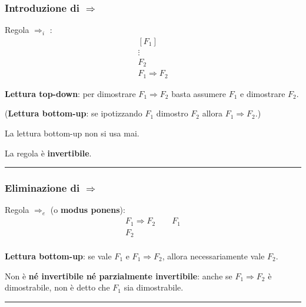 \documentclass[
  a4paper,
]{article}
\begin{document}
\hypertarget{introduzione-di-rightarrow}{%
\subsubsection{\texorpdfstring{Introduzione di
\(\Rightarrow\)}{Introduzione di \textbackslash Rightarrow}}\label{introduzione-di-rightarrow}}

Regola \(\Rightarrow_i\) : \[
\begin{matrix} 
[F_1] \\
\vdots \\
F_2 \\
\hline
F_1 \Rightarrow F_2 
\end{matrix}
\]

\textbf{Lettura top-down}: per dimostrare \(F_1 \Rightarrow F_2\) basta
assumere \(F_1\) e dimostrare \(F_2\).

(\textbf{Lettura bottom-up}: se ipotizzando \(F_1\) dimostro \(F_2\)
allora \(F_1 \Rightarrow F_2\).)

La lettura bottom-up non si usa mai.

La regola è \textbf{invertibile}.

\par\noindent\rule{\linewidth}{0.4pt}\par\vspace{6pt}

\hypertarget{eliminazione-di-rightarrow}{%
\subsubsection{\texorpdfstring{Eliminazione di
\(\Rightarrow\)}{Eliminazione di \textbackslash Rightarrow}}\label{eliminazione-di-rightarrow}}

Regola \(\Rightarrow_e\) (o \textbf{modus ponens}): \[
\begin{matrix} 
F_1\Rightarrow F_2 \quad\quad F_1 \\
\hline
F_2 \\
\end{matrix}
\]

\textbf{Lettura bottom-up}: se vale \(F_1\) e \(F_1 \Rightarrow F_2\),
allora necessariamente vale \(F_2\).

Non è \textbf{né invertibile né parzialmente invertibile}: anche se
\(F_1 \Rightarrow F_2\) è dimostrabile, non è detto che \(F_1\) sia
dimostrabile.

\par\noindent\rule{\linewidth}{0.4pt}\par\vspace{6pt}
\end{document}
